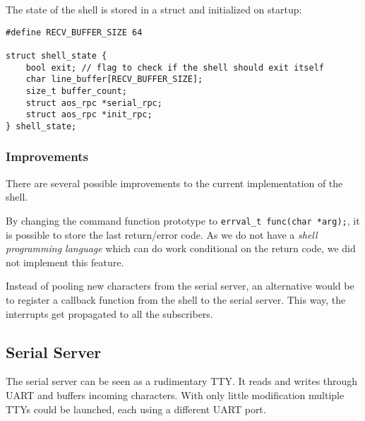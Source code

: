 The state of the shell is stored in a struct and initialized on startup:

\begin{lstlisting}
#define RECV_BUFFER_SIZE 64

struct shell_state {
    bool exit; // flag to check if the shell should exit itself
    char line_buffer[RECV_BUFFER_SIZE];
    size_t buffer_count;
    struct aos_rpc *serial_rpc;
    struct aos_rpc *init_rpc;
} shell_state;
\end{lstlisting}

\subsubsection{Improvements}
There are several possible improvements to the current implementation of the shell.

By changing the command function prototype to \verb|errval_t func(char *arg);|, it is possible to store the last return/error code.
As we do not have a \emph{shell programming language} which can do work conditional on the return code, we did not implement this feature.

Instead of pooling new characters from the serial server, an alternative would be to register a callback function from the shell to the serial server.
This way, the interrupts get propagated to all the subscribers.


\subsection{Serial Server}
The serial server can be seen as a rudimentary TTY. It reads and writes through UART and buffers incoming characters.
With only little modification multiple TTYs could be launched, each using a different UART port.

